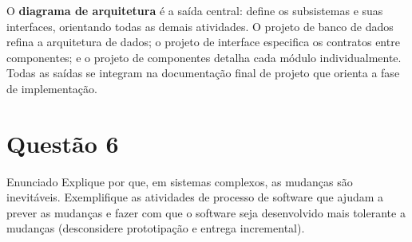 \documentclass[12pt,a4paper]{article}
\begin{document}
\begin{resposta}
\begin{center}
\end{center}

O \textbf{diagrama de arquitetura} é a saída central: define os subsistemas e
suas interfaces, orientando todas as demais atividades. O projeto de banco de
dados refina a arquitetura de dados; o projeto de interface especifica os
contratos entre componentes; e o projeto de componentes detalha cada módulo
individualmente. Todas as saídas se integram na documentação final de projeto
que orienta a fase de implementação.

\end{resposta}

\section*{Questão 6}

\begin{questao}{Enunciado}
Explique por que, em sistemas complexos, as mudanças são inevitáveis.
Exemplifique as atividades de processo de software que ajudam a prever as
mudanças e fazer com que o software seja desenvolvido mais tolerante a
mudanças (desconsidere prototipação e entrega incremental).
\end{questao}
\end{document}
